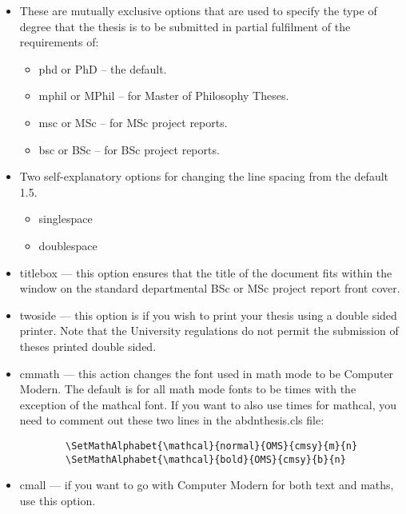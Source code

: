 \begin{itemize}

\item These are mutually exclusive options that are used to specify
 the type of degree that the thesis is to be submitted in partial
 fulfilment of the requirements of:

\begin{itemize}
\item phd or PhD -- the default.
\item mphil or MPhil -- for Master of Philosophy Theses.
\item msc or MSc -- for MSc project reports.
\item bsc or BSc -- for BSc project reports.
\end{itemize}

\item Two self-explanatory options for changing the line spacing from
 the default 1.5.

\begin{itemize}
\item singlespace
\item doublespace
\end{itemize}

\item titlebox --- this option ensures that the title of the document
 fits within the window on the standard departmental BSc or MSc
 project report front cover.
 
\item twoside --- this option is if you wish to print your thesis
  using a double sided printer.  Note that the University regulations 
  do not permit the submission of theses printed double sided.

\item cmmath --- this action changes the font used in math mode to be
  Computer Modern. The default is for all math mode fonts to be times
  with the exception of the mathcal font. If you want to also use
  times for mathcal, you need to comment out these two lines in the
  abdnthesis.cls file:
\begin{verbatim}
        \SetMathAlphabet{\mathcal}{normal}{OMS}{cmsy}{m}{n}
        \SetMathAlphabet{\mathcal}{bold}{OMS}{cmsy}{b}{n}
\end{verbatim}

\item cmall --- if you want to go with Computer Modern for both
  text and maths, use this option.


\end{itemize}


